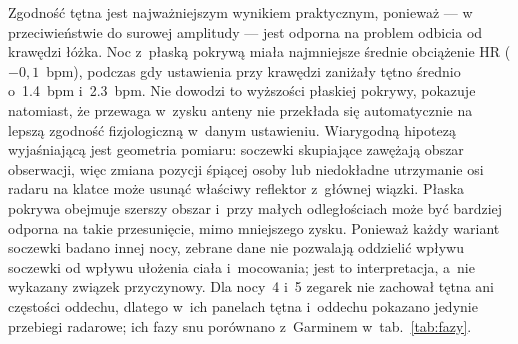 \documentclass[12pt,a4paper,oneside]{report}
\begin{document}
\begin{table}[H]
\centering
\caption{Porównanie tętna (okna snu poza czuwaniem): radar vs Garmin Fenix~7,
wartość Garmina najbliższa w~czasie, do \SI{2}{min}.}
\label{tab:hr}
\small
{}
\end{table}

Zgodność tętna jest najważniejszym wynikiem praktycznym, ponieważ --- w~
przeciwieństwie do surowej amplitudy --- jest odporna na problem odbicia od
krawędzi łóżka. Noc z~płaską pokrywą miała najmniejsze średnie obciążenie HR
($-0{,}1$~bpm), podczas gdy ustawienia przy krawędzi zaniżały tętno średnio
o~\SI{1.4}{bpm} i~\SI{2.3}{bpm}. Nie dowodzi to wyższości płaskiej pokrywy,
pokazuje natomiast, że przewaga w~zysku anteny nie przekłada się
automatycznie na lepszą zgodność fizjologiczną w~danym ustawieniu. Wiarygodną
hipotezą wyjaśniającą jest geometria pomiaru: soczewki skupiające zawężają
obszar obserwacji, więc zmiana pozycji śpiącej osoby lub niedokładne utrzymanie
osi radaru na klatce może usunąć właściwy reflektor z~głównej wiązki. Płaska
pokrywa obejmuje szerszy obszar i~przy małych odległościach może być bardziej
odporna na takie przesunięcie, mimo mniejszego zysku. Ponieważ każdy wariant
soczewki badano innej nocy, zebrane dane nie pozwalają oddzielić wpływu
soczewki od wpływu ułożenia ciała i~mocowania; jest to interpretacja, a~nie
wykazany związek przyczynowy. Dla nocy~4 i~5 zegarek nie zachował tętna
ani częstości oddechu, dlatego w~ich panelach tętna i~oddechu pokazano jedynie przebiegi
radarowe; ich fazy snu porównano z~Garminem w~tab.~\ref{tab:fazy}.
\end{document}
